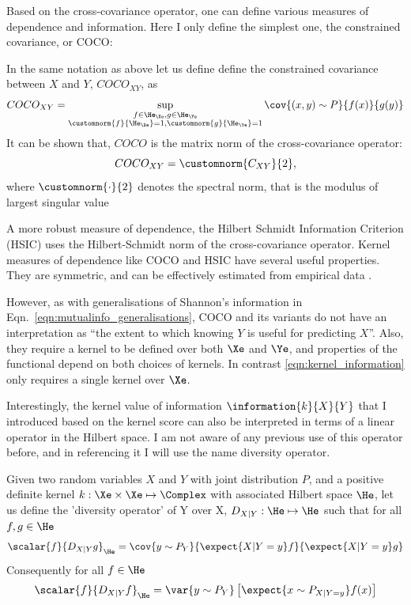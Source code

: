 Based on the cross-covariance operator, one can define various measures of dependence and information. Here I only define the simplest one, the constrained covariance, or COCO:

\begin{definition}
	In the same notation as above let us define define the constrained covariance between $X$ and $Y$, $COCO_{XY}$, as
	\begin{equation}
		COCO_{XY}=\sup_{\substack{f\in\He_\Xe, g\in\He_\Ye \\\customnorm{f}{\He_\Xe}=1,\customnorm{g}{\He_\Ye}=1}} \cov{(x,y)\sim P}{f(x)}{g(y)}
	\end{equation}
	It can be shown that, $COCO$ is the matrix norm of the cross-covariance operator:
	\begin{equation}
		COCO_{XY} = \customnorm{C_{XY}}{2},
	\end{equation}
	where $\customnorm{\cdot}{2}$ denotes the spectral norm, that is the modulus of largest singular value \citep{Gretton2005COCO}
\end{definition}

A more robust measure of dependence, the Hilbert Schmidt Information Criterion (HSIC) uses the Hilbert-Schmidt norm of the cross-covariance operator\citep{Gretton2005HSIC}. Kernel measures of dependence like COCO and HSIC have several useful properties. They are symmetric, and can be effectively estimated from empirical data \citep{Gretton2005HSIC}.

However, as with generalisations of Shannon's information in Eqn.\ \eqref{eqn:mutualinfo_generalisations}, COCO and its variants do not have an interpretation as ``the extent to which knowing $Y$ is useful for predicting $X$''. Also, they require a kernel to be defined over both $\Xe$ and $\Ye$, and properties of the functional depend on both choices of kernels. In contrast \eqref{eqn:kernel_information} only requires a single kernel over $\Xe$.

Interestingly, the kernel value of information $\information{k}{X}{Y}$ that I introduced based on the kernel score can also be interpreted in terms of a linear operator in the Hilbert space. I am not aware of any previous use of this operator before, and in referencing it I will use the name diversity operator.

\begin{definition}
Given two random variables $X$ and $Y$ with joint distribution $P$, and a positive definite kernel $k:\Xe\times\Xe\mapsto\Complex$ with associated Hilbert space $\He$, let us define the 'diversity operator' of Y over X, $D_{X\vert Y}:\He\mapsto\He$ such that for all $f,g\in\He$ 
\begin{align}
	\scalar{f}{D_{X\vert Y}g}_{\He} = \cov{y\sim P_Y}{\expect{X\vert Y=y} f}{\expect{X\vert Y=y} g}
\end{align}
Consequently for all $f\in\He$
\begin{align}
	\scalar{f}{D_{X\vert Y}f}_{\He} = \var{y\sim P_Y} \left[ \expect{x\sim P_{X\vert Y=y}} f(x) \right]
\end{align}
\end{definition}

